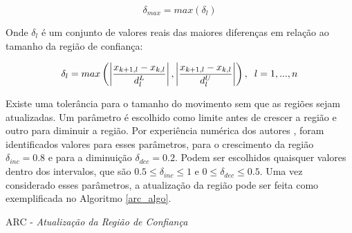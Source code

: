 \begin{equation}
  \delta_{max} = max(\delta_l)
\end{equation}

Onde \(\delta_l\) é um conjunto de valores reais das maiores diferenças em relação ao
tamanho da região de confiança:

\begin{equation}
  \delta_l = max \left ( \left | \frac{x_{k+1, l} - x_{k, l}}{d^L_l} \right |, \left | \frac{x_{k+1, l} - x_{k, l}}{d^U_l} \right | \right ), \hspace{0.2cm} l = 1, ..., n
\end{equation}

Existe uma tolerância para o tamanho do movimento sem que as regiões sejam atualizadas.
Um parâmetro é escolhido como limite antes de crescer a região e outro para diminuir a
região. Por experiência numérica dos autores \cite{Still2010}, foram identificados valores para esses
parâmetros, para o crescimento da região \(\delta_{inc} = 0.8\) e para a diminuição
\(\delta_{dec} = 0.2\). Podem ser escolhidos quaisquer valores dentro dos intervalos,
que são \(0.5 \leq \delta_{inc} \leq 1\) e \(0 \leq \delta_{dec} \leq 0.5\). Uma
vez considerado esses parâmetros, a atualização da região pode ser feita como exemplificada
no Algoritmo \ref{arc_algo}.

\vspace{15pt}
\begin{algorithm}[H]
  \label{arc_algo}
  \SetAlgoLined
  \caption{ARC - \textit{Atualização da Região de Confiança}}
\end{algorithm}
\vspace{15pt}

